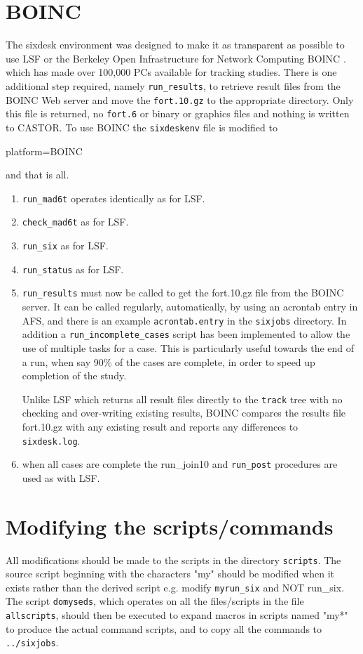 \documentclass{article}    %
\begin{document}
\section{BOINC}
The sixdesk environment was designed to make it as transparent as possible
to use LSF or the 
Berkeley Open Infrastructure for Network Computing BOINC \cite{Boinc}.
which has made over 100,000 PCs available for tracking studies.
There is one additional step required, namely {\tt run\_results}, to
retrieve result files from the BOINC Web server 
and move the {\tt fort.10.gz} to the appropriate directory.
Only this file is returned, no {\tt fort.6} or binary
or graphics files and nothing is written to CASTOR.
To use BOINC the {\tt sixdeskenv} file is modified to
\begin{description}
\item[platform=BOINC]
\end{description}
and that is all.
\begin{enumerate}
\item {\tt run\_mad6t} operates identically as for LSF.
\item {\tt check\_mad6t} as for LSF.
\item {\tt run\_six} as for LSF. 
\item {\tt run\_status} as for LSF. 
\item {\tt run\_results} must now be called to get the fort.10.gz file from the
BOINC server. It can be called regularly, automatically, by using an acrontab
entry in AFS, and there is an example {\tt acrontab.entry} in the {\tt sixjobs}
directory. In addition a {\tt run\_incomplete\_cases} script has been implemented to
allow the use of multiple tasks for a case. This is particularly useful  
towards the end of a run,
when say 90\% of the cases are complete, in order 
to speed up completion of the study.

Unlike LSF which returns all result files directly to the {\tt track} tree
with no checking and over-writing existing results, BOINC 
compares the results file fort.10.gz with any existing result
and reports any differences to {\tt sixdesk.log}.
\item when all cases are complete the {run\_join10} and {\tt run\_post}
procedures are used as with LSF.
\end{enumerate}

\section{Modifying the scripts/commands}
All modifications should be made to the scripts in the directory
{\tt scripts}. The source script beginning with the characters
"my" should be modified when it exists rather than the derived script
e.g. modify {\tt myrun\_six} and NOT {run\_six}. The script {\tt domyseds},
which operates on all the files/scripts in the file {\tt allscripts},
should then be executed to expand macros in scripts named "my*" to
produce the actual command scripts, and to copy  all the commands
to {\tt ../sixjobs}.
\end{document}
